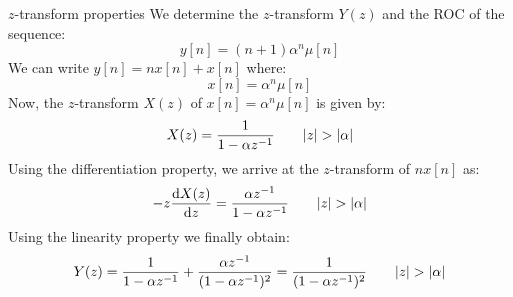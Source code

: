 \documentclass[../../main/main.tex]{subfiles}
\begin{document}
\begin{example}{\( z \)-transform properties}{}
    We determine the \( z \)-transform \( Y(z) \) and the ROC of the sequence:
    \begin{equation}
        y[n]
        =
        (n+1) \alpha^{n} \mu[n]
        \label{eq:L14_S69_1}
    \end{equation}
    We can write \( y[n] = nx[n] + x[n] \) where:
    \begin{equation}
        x[n]
        =
        \alpha^{n} \mu[n]
        \label{eq:L14_S69_2}
    \end{equation}
    Now, the \( z \)-transform \( X(z) \) of \( x[n] = \alpha^{n} \mu[n] \) is given by:
    \begin{equation}
        X(z)
        =
        \frac{1}{1 - \alpha z^{-1}}
        \qquad
        \abs{z} > \abs{\alpha}
        \label{eq:L14_S70_1}
    \end{equation}
    Using the differentiation property, we arrive at the \( z \)-transform of \( nx[n] \) as:
    \begin{equation}
        -z \dv{X(z)}{z}
        =
        \frac{\alpha z^{-1}}{1 - \alpha z^{-1}}
        \qquad
        \abs{z} > \abs{\alpha}
        \label{eq:L14_S70_2}
    \end{equation}
    Using the linearity property we finally obtain:
    \begin{equation}
        Y(z)
        =
        \frac{1}{1 - \alpha z^{-1}} + \frac{\alpha z^{-1}}{(1 - \alpha z^{-1})^2}
        =
        \frac{1}{(1 - \alpha z^{-1})^2}
        \qquad
        \abs{z} > \abs{\alpha}
        \label{eq:L14_S71_1}
    \end{equation}
\end{example}
\end{document}
